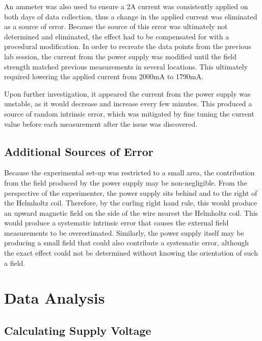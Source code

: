 \documentclass[a4paper]{article}
\begin{document}
\qq An ammeter was also used to ensure a 2A current was consistently applied on both
days of data collection, thus a change in the applied current was eliminated as
a source of error. Because the source of this error was ultimately not
determined and eliminated, the effect had to be compensated for with a
procedural modification. In order to recreate the data points from the previous
lab session, the current from the power supply was modified until the field
strength matched previous measurements in several locations. This ultimately
required lowering the applied current from 2000mA to 1790mA.

\qq Upon further investigation, it appeared the current from the power supply was
unstable, as it would decrease and increase every few minutes. This produced a
source of random intrinsic error, which was mitigated by fine tuning the current
value before each measurement after the issue was discovered.


\subsection{Additional Sources of Error}


\qq Because the experimental set-up was restricted to a small area, the contribution
from the field produced by the power supply may be non-negligible. From the
perspective of the experimenter, the power supply sits behind and to the right
of the Helmholtz coil. Therefore, by the curling right hand rule, this would
produce an upward magnetic field on the side of the wire nearest the Helmholtz
coil. This would produce a systematic intrinsic error that causes the external
field measurements to be overestimated. Similarly, the power supply itself may
be producing a small field that could also contribute a systematic error,
although the exact effect could not be determined without knowing the
orientation of such a field.


\section{Data Analysis}


\subsection{Calculating Supply Voltage}
\end{document}
